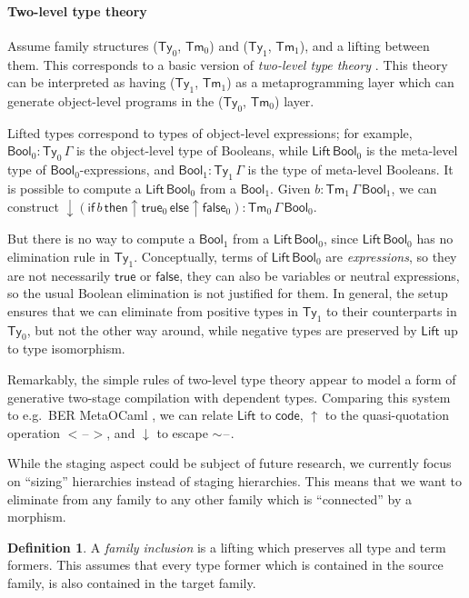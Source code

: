 \documentclass[a4paper,UKenglish,cleveref, autoref, thm-restate]{lipics-v2021}
\theoremstyle{remark}
\theoremstyle{definition}
\newtheorem{mydefinition}{Definition}
\newcommand{\Ty}{\mathsf{Ty}}
\newcommand{\Tm}{\mathsf{Tm}}
\newcommand{\blank}{\mathord{\hspace{1pt}\text{--}\hspace{1pt}}}
\newcommand{\Bool}{\mathsf{Bool}}
\newcommand{\true}{\mathsf{true}}
\newcommand{\false}{\mathsf{false}}
\newcommand{\up}{\uparrow}
\newcommand{\down}{\downarrow}
\newcommand{\Lift}{\mathsf{Lift}}
\begin{document}
\paragraph{Two-level type theory}
Assume family structures ($\Ty_0$, $\Tm_0$) and ($\Ty_1$, $\Tm_1$), and a
lifting between them. This corresponds to a basic version of \emph{two-level
  type theory} \cite{twolevel}. This theory can be interpreted as having ($\Ty_1$,
$\Tm_1$) as a metaprogramming layer which can generate object-level programs in
the ($\Ty_0$, $\Tm_0$) layer.

Lifted types correspond to types of object-level expressions; for
example, $\Bool_0 : \Ty_0\,\Gamma$ is the object-level type of Booleans, while
$\Lift\,\Bool_0$ is the meta-level type of $\Bool_0$-expressions, and $\Bool_1 :
\Ty_1\,\Gamma$ is the type of meta-level Booleans. It is possible to compute a
$\Lift\,\Bool_0$ from a $\Bool_1$. Given $b : \Tm_1\,\Gamma\,\Bool_1$, we can
construct
$\down(\mathsf{if}\,b\,\mathsf{then}\up\!\true_0\,\mathsf{else}\up\!\false_0) :
\Tm_0\,\Gamma\,\Bool_0$.

But there is no way to compute a $\Bool_1$ from a $\Lift\,\Bool_0$, since
$\Lift\,\Bool_0$ has no elimination rule in $\Ty_1$. Conceptually, terms
of $\Lift\,\Bool_0$ are \emph{expressions}, so they are not necessarily $\true$ or
$\false$, they can also be variables or neutral expressions, so the usual
Boolean elimination is not justified for them. In general, the setup ensures that
we can eliminate from positive types in $\Ty_1$ to their counterparts in
$\Ty_0$, but not the other way around, while negative types are preserved by
$\Lift$ up to type isomorphism.

Remarkably, the simple rules of two-level type theory appear to model a form of
generative two-stage compilation with dependent types. Comparing this system to
e.g.\ BER MetaOCaml \cite{kiselyov14metaocaml}, we can relate $\Lift$ to $\mathsf{code}$, $\up$
to the quasi-quotation operation $<\!\blank\!>$, and $\down$ to escape
$\sim\!\blank$.

While the staging aspect could be subject of future research, we currently focus
on ``sizing'' hierarchies instead of staging hierarchies. This means that we
want to eliminate from any family to any other family which is ``connected'' by
a morphism.

\begin{mydefinition} A \emph{family inclusion} is a lifting which preserves all type
and term formers. This assumes that every type former which is contained in the source family,
is also contained in the target family.
\end{mydefinition}
\end{document}

